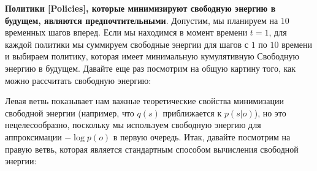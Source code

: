 \documentclass[twoside,leqno, 11pt]{article}
\begin{document}
	\textbf{Политики [Policies], которые минимизируют свободную энергию в будущем, являются предпочтительными}. Допустим, мы планируем на $10$ временных шагов вперед. Если мы находимся в момент времени $t = 1$, для каждой политики мы суммируем свободные энергии для шагов с $1$ по $10$ времени и выбираем политику, которая имеет минимальную кумулятивную Свободную энергию в будущем. Давайте еще раз посмотрим на общую картину того, как можно рассчитать свободную энергию:
	
	\begin{figure}[h]	
		\label{ris:image}
	\end{figure}
	
	\newpage
	
	Левая ветвь показывает нам важные теоретические свойства минимизации свободной энергии (например, что $q(s)$ приближается к $p(s|o)$), но это нецелесообразно, поскольку мы используем свободную энергию для аппроксимации $-\log p(o)$ в первую очередь. Итак, давайте посмотрим на правую ветвь, которая является стандартным способом вычисления свободной энергии:
	
	\begin{figure}[h]	
		\label{ris:image}
	\end{figure}
	
\end{document}
